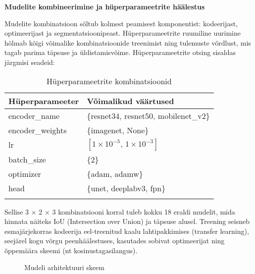 \textbf{Mudelite kombineerimine ja hüperparameetrite häälestus}

Mudelite kombinatsioon sõltub kolmest peamisest komponentist: kodeerijast, optimeerijast ja segmentatsioonipeast. Hüperparameetrite ruumiline uurimine hõlmab kõigi võimalike kombinatsioonide treenimist ning tulemuste võrdlust, mis tagab parima täpsuse ja üldistamisvõime. Hüperparameetrite otsing sisaldas järgmisi seadeid:

\begin{longtable}{ll}
    \hline
    \textbf{Hüperparameeter} & \textbf{Võimalikud väärtused} \\
    \hline
    encoder\_name      & \{resnet34, resnet50, mobilenet\_v2\} \\
    encoder\_weights   & \{imagenet, None\} \\
    lr                 & $[1\times10^{-5},\,1\times10^{-3}]$ \\
    batch\_size        & \{2\} \\
    optimizer          & \{adam, adamw\} \\
    head               & \{unet, deeplabv3, fpn\} \\
    \hline
    \caption{Hüperparameetrite kombinatsioonid}
    \label{tab:hyperparameter_kombinatsioonid}
\end{longtable}


Sellise 3 × 2 × 3 kombinatsiooni korral tuleb kokku 18 eraldi mudelit, mida hinnata näiteks IoU (Intersection over Union) ja täpsuse alusel. Treening seisneb esmajärjekorras kodeerija eel-treenitud kaalu lahtipakkimises (transfer learning), seejärel kogu võrgu peenhäälestuses, kasutades sobivat optimeerijat ning õppemäära skeemi (nt kosinustagasilangus).


\begin{figure}
    \centering
    \caption{Mudeli arhitektuuri skeem}
    \label{fig:model_architecture}
\end{figure}


